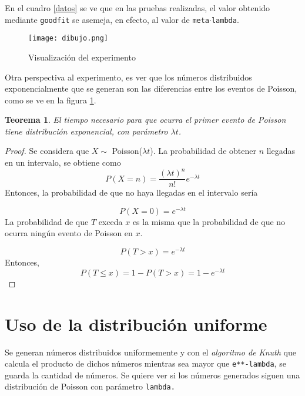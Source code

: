\documentclass[12pt,letterpaper]{article}
\newtheorem{theorem}{Teorema}
\begin{document}
En el cuadro \ref{datos} se ve que en las pruebas realizadas, el valor obtenido mediante \texttt{goodfit} se asemeja, en efecto, al valor de \texttt{meta}$\cdot$\texttt{lambda}.

\begin{figure}
\centering
\texttt{[image: dibujo.png]} 		
\caption{Visualización del experimento}
 \label{exp}

\end{figure}

Otra perspectiva al experimento, es ver que los números distribuidos exponencialmente que se generan son las diferencias entre los eventos de Poisson, como se ve en la figura \ref{exp}. 

\begin{theorem}
El tiempo necesario para que ocurra el primer evento de Poisson tiene distribución exponencial, con parámetro $\lambda t$. 

\end{theorem}

\begin{proof}
Se considera que $X \sim $ Poisson($\lambda t$). La probabilidad de obtener $n$ llegadas en un intervalo, se obtiene como
 \begin{equation}
 P(X=n)=\frac{(\lambda t)^{n}}{n!}e^{-\lambda t}
 \end{equation}
Entonces, la probabilidad de que no haya llegadas en el intervalo sería

\begin{equation}
P(X=0)=e^{-\lambda t}
\end{equation}
La probabilidad de que $T$ exceda $x$ es la misma que la probabilidad de que no ocurra ningún evento de Poisson en $x$.

\begin{equation}
P(T> x) = e^{-\lambda t}
\end{equation}
Entonces,
\begin{equation}
P(T\leqslant x)=1-P(T> x) = 1-e^{-\lambda t}
\end{equation}
\end{proof}


 

\section{Uso de la distribución uniforme}
Se generan números distribuidos uniformemente y con el \textit{algoritmo de Knuth} \cite{Knuth} que calcula el producto de dichos números mientras sea mayor que \texttt{e**-lambda}, se guarda la cantidad de números. Se quiere ver si los números generados siguen una distribución de Poisson con parámetro \texttt{lambda.}
\end{document}

